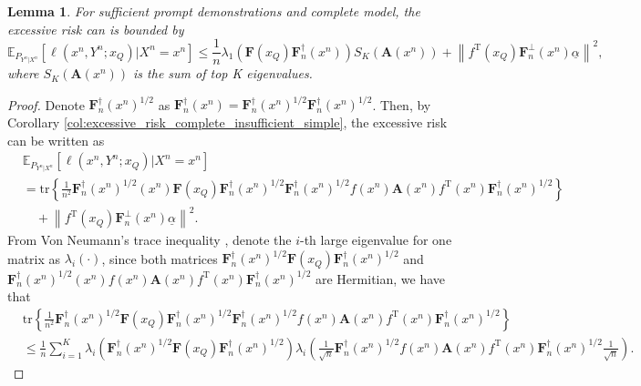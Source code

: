 \documentclass{article} %
\theoremstyle{plain} %
\newtheorem{lemma}[theorem]{Lemma}          %
\begin{document}
\begin{lemma}\label{lem:better_ub_complete_insufficient}
For sufficient prompt demonstrations and complete model, the excessive risk can is bounded by
\begin{equation*}
    \mathbb{E}_{P_{Y^n|X^n}}\left[ 
\ell \left(x^n,Y^n;x_Q\right) | X^n = x^n\right] \leq \frac1n \lambda_1\left(\mathbf{F}(x_Q)\mathbf{F}_n^{\dagger}(x^n) \right) S_K({\textbf{A}}(x^n))+ \left\| f ^{\mathrm{T}}(x_Q)\mathbf{F}_n^\perp(x^n)\underline{\alpha}\right\|^2,
\end{equation*}
where $S_K({\textbf{A}}(x^n))$ is the sum of top K eigenvalues.
\end{lemma}
\begin{proof}
Denote $\mathbf{F}_n^\dagger(x^n)^{1/2}$ as $\mathbf{F}_n^{\dagger}(x^n) = \mathbf{F}_n^\dagger(x^n)^{1/2}\mathbf{F}_n^\dagger(x^n)^{1/2}$. Then, by Corollary \ref{col:excessive_risk_complete_insufficient_simple}, the excessive risk can be written as
\begin{align*}
& \mathbb{E}_{P_{Y^n|X^n}}\left[ 
\ell \left(x^n,Y^n;x_Q\right) | X^n = x^n\right]\\
& = \mathrm{tr}\left\{ \frac1{n^2}\mathbf{F}_n^\dagger(x^n)^{1/2}(x^n)\mathbf{F}(x_Q)\mathbf{F}_n^\dagger(x^n)^{1/2}\mathbf{F}_n^\dagger(x^n)^{1/2} f(x^n) {\mathbf{A}}(x^n) f^\mathrm{T}(x^n)\mathbf{F}_n^\dagger(x^n)^{1/2} \right\}\\
&\quad + \left\| f ^{\mathrm{T}}(x_Q)\mathbf{F}_n^\perp(x^n)\underline{\alpha}\right\|^2.
\end{align*}
From Von Neumann's trace inequality \citep{mirsky1975trace}, denote the $i$-th large eigenvalue for one matrix as $\lambda_i(\cdot)$, since both matrices $\mathbf{F}_n^\dagger(x^n)^{1/2}\mathbf{F}(x_Q)\mathbf{F}_n^\dagger(x^n)^{1/2}$ and $\mathbf{F}_n^\dagger(x^n)^{1/2}(x^n) f(x^n){\mathbf{A}}(x^n) f^\mathrm{T}(x^n)\mathbf{F}_n^\dagger(x^n)^{1/2}$ are Hermitian, we have that
\begin{align*}
& \mathrm{tr}\left\{ \frac1{n^2}\mathbf{F}_n^\dagger(x^n)^{1/2}\mathbf{F}(x_Q)\mathbf{F}_n^\dagger(x^n)^{1/2} \mathbf{F}_n^\dagger(x^n)^{1/2}f(x^n){\mathbf{A}}(x^n) f^\mathrm{T}(x^n)\mathbf{F}_n^\dagger(x^n)^{1/2} \right\}\\
& \leq \frac1n \sum_{i=1}^K \lambda_i\left(\mathbf{F}_n^\dagger(x^n)^{1/2}\mathbf{F}(x_Q)\mathbf{F}_n^\dagger(x^n)^{1/2}\right) \lambda_i\left(\frac1{\sqrt{n}}\mathbf{F}_n^\dagger(x^n)^{1/2} f(x^n){\mathbf{A}}(x^n) f^\mathrm{T}(x^n)\mathbf{F}_n^\dagger(x^n)^{1/2}\frac1{\sqrt{n}}\right).
\end{align*}

\end{proof}
\end{document}
